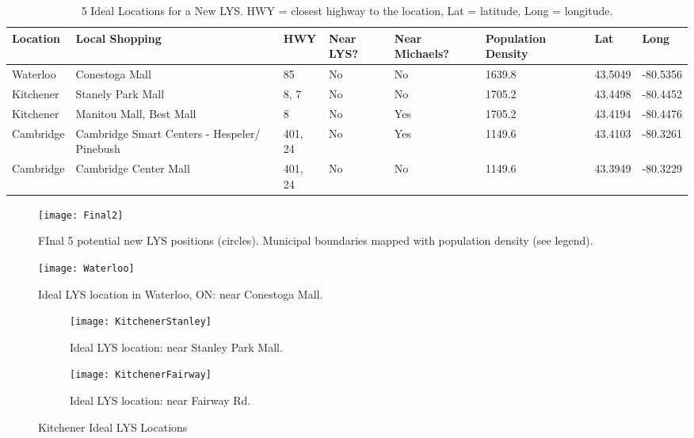 \documentclass[10pt,a4paper]{report}
\begin{document}
	\begin{table}[h!]
	\centering
	\caption{5 Ideal Locations for a New LYS. HWY = closest highway to the location, Lat = latitude, Long = longitude.}
	\label{guesstimatecoords_df}
	\begin{tabular}{@{}lp{15mm}lllp{15mm}ll@{}}
		\toprule
		Location & Local Shopping & HWY & Near LYS? & Near Michaels? & Population Density & Lat & Long \\ 
		\midrule
		Waterloo & Conestoga Mall & 85 & No & No & 1639.8 & 43.5049 & -80.5356 \\ 
		
		Kitchener & Stanely Park Mall & 8, 7 & No & No & 1705.2 & 43.4498 & -80.4452 \\ 
		
		Kitchener & Manitou Mall, Best Mall & 8 & No & Yes & 1705.2 & 43.4194 & -80.4476 \\ 
		
		Cambridge & Cambridge Smart Centers - Hespeler/ Pinebush & 401, 24 & No & Yes & 1149.6 & 43.4103 & -80.3261 \\ 
		
		Cambridge & Cambridge Center Mall & 401, 24 & No & No & 1149.6 & 43.3949 & -80.3229 \\ 
		\bottomrule
	\end{tabular} 
\end{table}

\begin{figure}[h!]
	\centering
	\texttt{[image: Final2]}
	\caption{FInal 5 potential new LYS positions (circles). Municipal boundaries mapped with population density (see legend).}
	\label{fig:final2}
\end{figure}

\begin{figure}[h!]
	\centering
	\texttt{[image: Waterloo]}
	\caption{Ideal LYS location in Waterloo, ON: near Conestoga Mall.}
	\label{fig:WaterlooLocation}
\end{figure}

\begin{figure}[h!]
	\centering
	\begin{subfigure}{.5\textwidth}
		\centering
		\texttt{[image: KitchenerStanley]}
		\caption{Ideal LYS location: near Stanley Park Mall.}
		\label{fig:kitchener1}
	\end{subfigure}%
	\begin{subfigure}{.5\textwidth}
		\centering
		\texttt{[image: KitchenerFairway]}
		\caption{Ideal LYS location: near Fairway Rd.}
		\label{fig:kitchener2}
	\end{subfigure}
	\caption{Kitchener Ideal LYS Locations}
	\label{fig:kitchenerLocations}
\end{figure}
\end{document}
